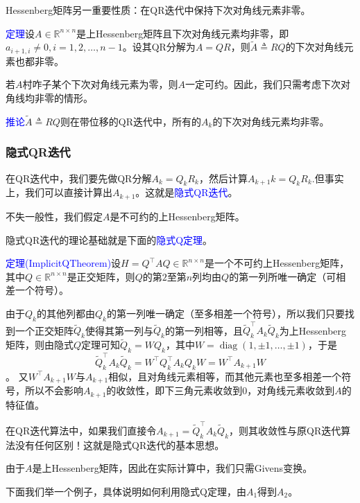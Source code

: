 \documentclass[12pt,a4paper]{article}
\begin{document}
Hessenberg矩阵另一重要性质：在QR迭代中保持下次对角线元素非零。

\textcolor{blue}{定理}\quad 设$A \in \mathbb{R}^{n \times n}$是上Hessenberg矩阵且下次对角线元素均非零，即$a_{i+1, i} \neq 0, i=1,2, \ldots, n-1$。设其QR分解为$A=QR$，则$\tilde{A} \triangleq R Q$的下次对角线元素也都非零。

若$A$村咋子某个下次对角线元素为零，则$A$一定可约。因此，我们只需考虑下次对角线均非零的情形。

\textcolor{blue}{推论}\quad $\tilde{A} \triangleq R Q$则在带位移的QR迭代中，所有的$A_k$的下次对角线元素均非零。
\subsubsection{隐式QR迭代}
在QR迭代中，我们要先做QR分解$A_k=Q_kR_k$，然后计算$A_{k+1}k=Q_kR_k$.但事实上，我们可以直接计算出$A_{k+1}$。这就是\textcolor{blue}{隐式QR迭代}。

不失一般性，我们假定$A$是不可约的上Hessenberg矩阵。

隐式QR迭代的理论基础就是下面的\textcolor{blue}{隐式Q定理}。

\textcolor{blue}{定理(ImplicitQTheorem)}\quad 设$H=Q^{\top} A Q \in \mathbb{R}^{n \times n}$是一个不可约上Hessenberg矩阵，其中$Q \in \mathbb{R}^{n \times n}$是正交矩阵，则$Q$的第$2$至第$n$列均由$Q$的第一列所唯一确定（可相差一个符号）。

由于$Q_k$的其他列都由$Q_k$的第一列唯一确定（至多相差一个符号），所以我们只要找到一个正交矩阵$\tilde{Q}_{k}$使得其第一列与$\tilde{Q}_{k}$的第一列相等，且$\tilde{Q}_{k}^{\top} A_{k} \tilde{Q}_{k}$为上Hessenberg矩阵，则由隐式$Q$定理可知$\tilde{Q}_{k}=W Q_{k}$，其中$W=\operatorname{diag}(1, \pm 1, \ldots, \pm 1)$，于是$$
\tilde{Q}_{k}^{\top} A_{k} \tilde{Q}_{k}=W^{\top} Q_{k}^{\top} A_{k} Q_{k} W=W^{\top} A_{k+1} W
$$。
又$W^{\top} A_{k+1} W$与$A_{k+1}$相似，且对角线元素相等，而其他元素也至多相差一个符号，所以不会影响$A_{k+1}$的收敛性，即下三角元素收敛到$0$，对角线元素收敛到$A$的特征值。

在QR迭代算法中，如果我们直接令$A_{k+1}=\tilde{Q}_{k}^{\top} A_{k} \tilde{Q}_{k}$，则其收敛性与原QR迭代算法没有任何区别！这就是隐式QR迭代的基本思想。

由于$A$是上Hessenberg矩阵，因此在实际计算中，我们只需Givens变换。

下面我们举一个例子，具体说明如何利用隐式Q定理，由$A_1$得到$A_2$。
\end{document}

